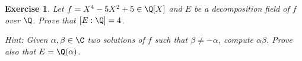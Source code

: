 \documentclass[a4paper,10pt,reqno]{amsart}
\newtheorem{ex}{Exercise}[section]
\newenvironment{sol}
  {\renewcommand\qedsymbol{$\blacksquare$}\begin{proof}[Solution]}
  {\end{proof}}
\begin{document}
    



\begin{ex}
    Let $f=X^4-5X^2+5\in \Q[X]$ and $E$ be a decomposition field of $f$ over $\Q$. 
    Prove that $[E:\Q]=4$. 

    \textit{Hint:}
    Given $\alpha,\beta\in \C$
    two solutions of $f$ such that $\beta\neq-\alpha$,
    compute $\alpha\beta$.
    Prove also that $E=\Q(\alpha)$.
\end{ex}
\end{document}
